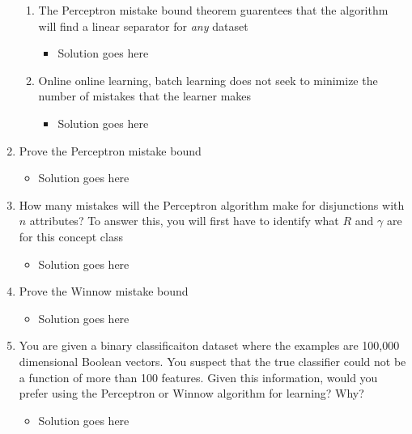 \documentclass{article}
\begin{document}
\begin{enumerate}
\begin{enumerate}
	\item The Perceptron mistake bound theorem guarentees that the algorithm will find a linear separator for {\em any} dataset
		\begin{itemize}
		\item Solution goes here
		\end{itemize}

	\item Online online learning, batch learning does not seek to minimize the number of mistakes that the learner makes
		\begin{itemize}
		\item Solution goes here
		\end{itemize}

	\end{enumerate}

\item Prove the Perceptron mistake bound

	\begin{itemize}
	\item Solution goes here
	\end{itemize}


\item How many mistakes will the Perceptron algorithm make for disjunctions with $n$ attributes? To answer this, you will first have to identify what $R$ and $\gamma$ are for this concept class

	\begin{itemize}
	\item Solution goes here
	\end{itemize}



\item Prove the Winnow mistake bound


	\begin{itemize}
	\item Solution goes here
	\end{itemize}



\item You are given a binary classificaiton dataset where the examples are 100,000 dimensional Boolean vectors. You suspect that the true classifier could not be a function of more than 100 features. Given this information, would you prefer using the Perceptron or Winnow algorithm for learning? Why?


	\begin{itemize}
	\item Solution goes here
	\end{itemize}




\end{enumerate}
\end{document}
